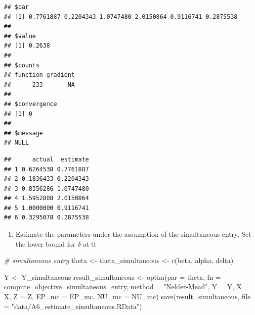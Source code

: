 \documentclass[
]{book}
\newenvironment{Shaded}{\begin{snugshade}}{\end{snugshade}}
\newcommand{\AttributeTok}[1]{\textcolor[rgb]{0.77,0.63,0.00}{#1}}
\newcommand{\CommentTok}[1]{\textcolor[rgb]{0.56,0.35,0.01}{\textit{#1}}}
\newcommand{\FunctionTok}[1]{\textcolor[rgb]{0.00,0.00,0.00}{#1}}
\newcommand{\NormalTok}[1]{#1}
\newcommand{\OtherTok}[1]{\textcolor[rgb]{0.56,0.35,0.01}{#1}}
\newcommand{\SpecialCharTok}[1]{\textcolor[rgb]{0.00,0.00,0.00}{#1}}
\newcommand{\StringTok}[1]{\textcolor[rgb]{0.31,0.60,0.02}{#1}}
\providecommand{\tightlist}{%
  \setlength{\itemsep}{0pt}\setlength{\parskip}{0pt}}
\begin{document}
\begin{verbatim}
## $par
## [1] 0.7761887 0.2204343 1.0747480 2.0150864 0.9116741 0.2875538
## 
## $value
## [1] 0.2638
## 
## $counts
## function gradient 
##      233       NA 
## 
## $convergence
## [1] 0
## 
## $message
## NULL
\end{verbatim}

\begin{Shaded}
\end{Shaded}

\begin{verbatim}
##      actual  estimate
## 1 0.6264538 0.7761887
## 2 0.1836433 0.2204343
## 3 0.8356286 1.0747480
## 4 1.5952808 2.0150864
## 5 1.0000000 0.9116741
## 6 0.3295078 0.2875538
\end{verbatim}

\begin{enumerate}
\def\labelenumi{\arabic{enumi}.}
\setcounter{enumi}{6}
\tightlist
\item
  Estimate the parameters under the assumption of the simultaneous entry. Set the lower bound for \(\delta\) at 0.
\end{enumerate}

\begin{Shaded}
\begin{Highlighting}[]
\CommentTok{\# simultaneous entry}
\NormalTok{theta }\OtherTok{\textless{}{-}}\NormalTok{ theta\_simultaneous }\OtherTok{\textless{}{-}}
  \FunctionTok{c}\NormalTok{(beta, alpha, delta)}
\end{Highlighting}
\end{Shaded}

\begin{Shaded}
\begin{Highlighting}[]
\NormalTok{Y }\OtherTok{\textless{}{-}}\NormalTok{ Y\_simultaneous}
\NormalTok{result\_simultaneous }\OtherTok{\textless{}{-}}
  \FunctionTok{optim}\NormalTok{(}\AttributeTok{par =}\NormalTok{ theta,}
        \AttributeTok{fn =}\NormalTok{ compute\_objective\_simultaneous\_entry,}
        \AttributeTok{method =} \StringTok{"Nelder{-}Mead"}\NormalTok{,}
        \AttributeTok{Y =}\NormalTok{ Y,}
        \AttributeTok{X =}\NormalTok{ X,}
        \AttributeTok{Z =}\NormalTok{ Z,}
        \AttributeTok{EP\_mc =}\NormalTok{ EP\_mc,}
        \AttributeTok{NU\_mc =}\NormalTok{ NU\_mc)}
\FunctionTok{save}\NormalTok{(result\_simultaneous, }\AttributeTok{file =} \StringTok{"data/A6\_estimate\_simultaneous.RData"}\NormalTok{)}
\end{Highlighting}
\end{Shaded}
\end{document}
